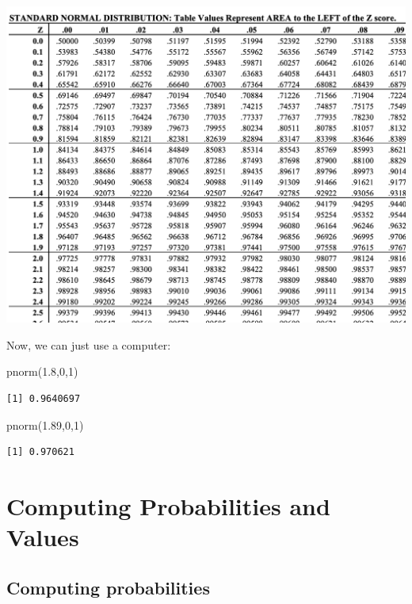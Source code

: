\documentclass[
  letterpaper,
  DIV=11,
  numbers=noendperiod]{scrartcl}
\newenvironment{Shaded}{\begin{snugshade}}{\end{snugshade}}
\newcommand{\DecValTok}[1]{\textcolor[rgb]{0.68,0.00,0.00}{#1}}
\newcommand{\FloatTok}[1]{\textcolor[rgb]{0.68,0.00,0.00}{#1}}
\newcommand{\FunctionTok}[1]{\textcolor[rgb]{0.28,0.35,0.67}{#1}}
\newcommand{\NormalTok}[1]{\textcolor[rgb]{0.00,0.23,0.31}{#1}}
\begin{document}
\includegraphics[width=3.5\linewidth,height=\textheight,keepaspectratio]{figures/normalTable.png}

Now, we can just use a computer:

\begin{Shaded}
\begin{Highlighting}[]
\FunctionTok{pnorm}\NormalTok{(}\FloatTok{1.8}\NormalTok{,}\DecValTok{0}\NormalTok{,}\DecValTok{1}\NormalTok{)}
\end{Highlighting}
\end{Shaded}

\begin{verbatim}
[1] 0.9640697
\end{verbatim}

\begin{Shaded}
\begin{Highlighting}[]
\FunctionTok{pnorm}\NormalTok{(}\FloatTok{1.89}\NormalTok{,}\DecValTok{0}\NormalTok{,}\DecValTok{1}\NormalTok{)}
\end{Highlighting}
\end{Shaded}

\begin{verbatim}
[1] 0.970621
\end{verbatim}

\section{Computing Probabilities and
Values}\label{computing-probabilities-and-values}

\subsection{Computing probabilities}\label{computing-probabilities}
\end{document}
